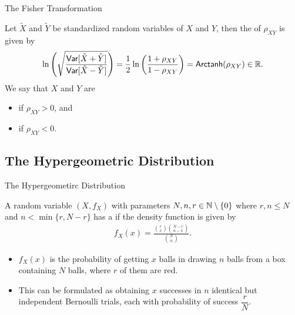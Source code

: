 \begin{frame}{The Fisher Transformation}

\justifying
{} Let $\tilde{X}$ and $\tilde{Y}$ be standardized random variables of $X$ and $Y$, then the  of $\rho_{XY}$ is given by
\begin{align*}
\ln\left(\sqrt{\frac{\mathsf{Var}[\tilde{X} + \tilde{Y}]}{\mathsf{Var}[\tilde{X} - \tilde{Y}]}} \right) = \frac{1}{2}\ln\left(\frac{1+\rho_{XY}}{1-\rho_{XY}} \right) = \mathsf{Arctanh}(\rho_{XY}) \in \mathbb{R}.
\end{align*}
We say that $X$ and $Y$ are
\begin{itemize}
	\item {} if $\rho_{XY} > 0$, and
	\item {} if $\rho_{XY} < 0$.
\end{itemize}

\end{frame}


\subsection{The Hypergeometric Distribution}

\begin{frame}{The Hypergeometirc Distribution}

\justifying
{} A random variable $(X, f_X)$ with parameters $N, n, r\in \mathbb{N}\setminus\{0\}$ where $r, n \leq N$ and $n < \min\{r, N-r\}$ has a  if the density function is given by
\begin{align*}
f_X(x) = \frac{\binom{r}{x}\binom{N-r}{n-x}}{\binom{N}{n}}.
\end{align*}
\begin{itemize}
	\justifying
	\item $f_X(x)$ is the probability of getting $x$ balls in drawing $n$ balls from a box containing $N$ balls, where $r$ of them are red.
	\item This can be formulated as obtaining $x$ successes in $n$ identical but  independent Bernoulli trials, each with probability of success $\dfrac{r}{N}$.
\end{itemize}

\end{frame}


